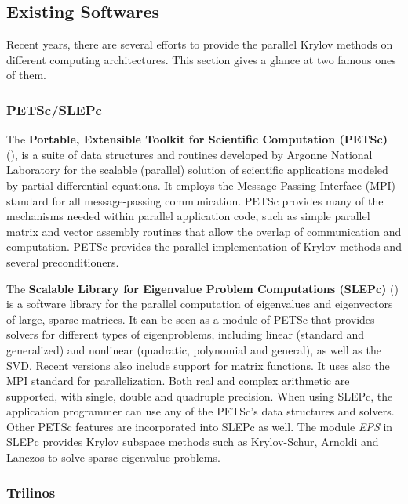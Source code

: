 \subsection{Existing Softwares}

Recent years, there are several efforts to provide the parallel Krylov methods on different computing architectures. This section gives a glance at two famous ones of them.

\subsubsection{PETSc/SLEPc} 

The \textbf{Portable, Extensible Toolkit for Scientific Computation (PETSc)} (\cite{balay2001petsc}), is a suite of data structures and routines developed by Argonne National Laboratory for the scalable (parallel) solution of scientific applications modeled by partial differential equations. It employs the Message Passing Interface (MPI) standard for all message-passing communication. PETSc provides many of the mechanisms needed within parallel application code, such as simple parallel matrix and vector assembly routines that allow the overlap of communication and computation. PETSc provides the parallel implementation of Krylov methods and several preconditioners.

The \textbf{Scalable Library for Eigenvalue Problem Computations (SLEPc)} (\cite{hernandez2005slepc}) is a software library for the parallel computation of eigenvalues and eigenvectors of large, sparse matrices. It can be seen as a module of PETSc that provides solvers for different types of eigenproblems, including linear (standard and generalized) and nonlinear (quadratic, polynomial and general), as well as the SVD. Recent versions also include support for matrix functions. It uses also the MPI standard for parallelization. Both real and complex arithmetic are supported, with single, double and quadruple precision. When using SLEPc, the application programmer can use any of the PETSc's data structures and solvers. Other PETSc features are incorporated into SLEPc as well. The module \textit{EPS} in SLEPc provides Krylov subspace methods such as Krylov-Schur, Arnoldi and Lanczos to solve sparse eigenvalue problems.

\subsubsection{Trilinos} 


